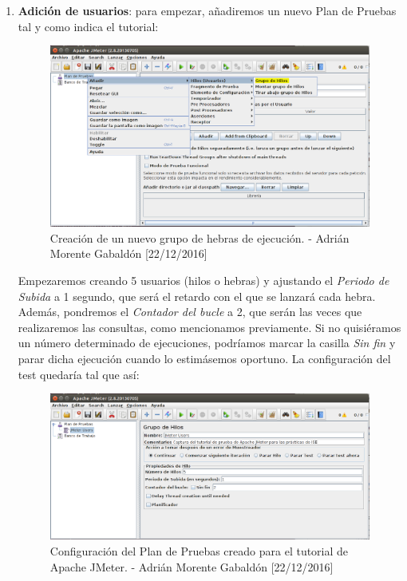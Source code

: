 \begin{enumerate}
		\item \textbf{Adición de usuarios}: para empezar, añadiremos un nuevo Plan de Pruebas tal y como indica el tutorial:
		\begin{figure}[H]
			\centering
			\includegraphics[scale=0.4]{jmeter-threadgroup}
			\caption{Creación de un nuevo grupo de hebras de ejecución. - Adrián Morente Gabaldón [22/12/2016]}
			\label{figura7}
		\end{figure}
		Empezaremos creando 5 usuarios (hilos o hebras) y ajustando el \emph{Periodo de Subida} a 1 segundo, que será el retardo con el que se lanzará cada hebra. Además, pondremos el \emph{Contador del bucle} a 2, que serán las veces que realizaremos las consultas, como mencionamos previamente. Si no quisiéramos un número determinado de ejecuciones, podríamos marcar la casilla \emph{Sin fin} y parar dicha ejecución cuando lo estimásemos oportuno. La configuración del test quedaría tal que así:
		\begin{figure}[H]
			\centering
			\includegraphics[scale=0.4]{jmeter-users}
			\caption{Configuración del Plan de Pruebas creado para el tutorial de Apache JMeter. - Adrián Morente Gabaldón [22/12/2016]}
			\label{figura6}
		\end{figure}
	

\end{enumerate}
